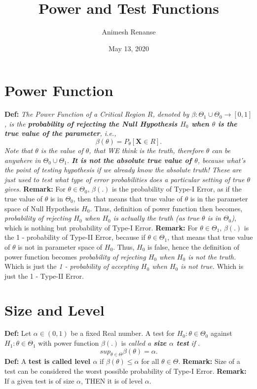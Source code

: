 \documentclass[a4paper]{article}
\title{Power and Test Functions}
\author{Animesh Renanse}
\date{May 13, 2020}
\begin{document}
\maketitle
\newpage

\section{Power Function}

\textbf{Def:} \textit{The Power Function of a Critical Region $R$, denoted by $\beta : \Theta_1 \cup \Theta_0 \to [0,1]$, is the \textbf{probability of rejecting the Null Hypothesis $H_0$ when $\theta$ is the true value of the parameter}, i.e.,}
\[
	\beta\left( \theta \right) = P_\theta\left[ \mathbf{X}\in R \right] 
.\]
\textit{Note that $\theta$ is the value of $\theta$, that WE think is the truth, therefore $\theta$ can be anywhere in  $\Theta_0 \cup \Theta_1$. \textbf{It is not the absolute true value of $\theta$}, because what's the point of testing hypothesis if we already know the absolute truth! These are just used to test what type of error probabilities does a particular setting of true $\theta$ gives. }
\newline\newline
\textbf{Remark:} For $\theta \in \Theta_0$, $\beta\left( . \right) $ is the probability of Type-I Error, as if the true value of $\theta$ is in $\Theta_0$, then that means that true value of $\theta$ is in the parameter space of Null Hypothesis $H_0$. Thus, definition of power function then becomes, \textit{probability of rejecting $H_0$ when $H_0$ is actually the truth (as true $\theta$ is in $\Theta_0$)}, which is nothing but probability of Type-I Error.
\newline\newline
\textbf{Remark:} For $\theta \in \Theta_1$, $\beta\left( . \right) $ is the 1 - probability of Type-II Error, because if $\theta \in \Theta_1$, that means that true value of $\theta$ is not in parameter space of $H_0$. Thus, $H_0$ is false, hence the definition of power function becomes \textit{probability of rejecting $H_0$ when $H_0$ is not the truth.} Which is just the \textit{1 - probability of accepting  $H_0$ when $H_0$ is not true.} Which is just the 1 - Type-II Error.


\section{Size and Level}
\textbf{Def:} Let $\alpha \in \left( 0,1 \right) $ be a fixed Real number. A test for $H_0:\theta \in \Theta_0$ against $H_1:\theta\in\Theta_1$ with power function $\beta\left( . \right) $ is \textit{called a \textbf{size $\alpha$ test } if }.
\[
sup_{\theta \in \Theta} \beta\left( \theta \right)  = \alpha
.\] 
\newline
\textbf{Def:} A \textbf{test is called level $\alpha$} if $\beta\left( \theta \right) \le \alpha$ for all $\theta \in \Theta$.
\newline\newline
\textbf{Remark:} Size of a test can be considered the worst possible probability of Type-I Error.
\newline\newline
\textbf{Remark:} If a given test is of size $\alpha$, THEN it is of level $\alpha$.
\end{document}
